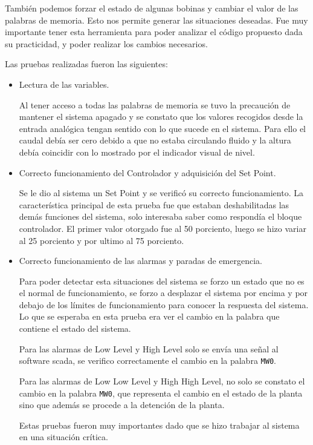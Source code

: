 También podemos forzar el estado de algunas bobinas y cambiar el valor de las 
palabras de memoria. Esto nos permite generar las situaciones deseadas.
Fue muy importante tener esta herramienta para poder analizar el código propuesto
dada su practicidad, y poder realizar los cambios necesarios.

Las pruebas realizadas fueron las siguientes:

\begin{itemize}
 \item Lectura de las variables.
 
 Al tener acceso a todas las palabras de memoria se tuvo la precaución de mantener el
 sistema apagado y se constato que los valores recogidos desde la entrada analógica
 tengan sentido con lo que sucede en el sistema. Para ello el caudal debía ser cero debido
 a que no estaba circulando fluido y la altura debía coincidir con lo mostrado por el 
 indicador visual de nivel. 
 
 \item Correcto funcionamiento del Controlador y adquisición del Set Point.
 
 Se le dio al sistema un Set Point y se verificó su correcto funcionamiento. 
 La característica principal de esta prueba fue que estaban deshabilitadas las demás
 funciones del sistema, solo interesaba saber como respondía el bloque controlador.
 El primer valor otorgado fue al 50 porciento, luego se hizo variar al 25 porciento
 y por ultimo al 75 porciento.
 
 \item Correcto funcionamiento de las alarmas y paradas de emergencia.
 
 Para poder detectar esta situaciones del sistema se forzo un estado que no es el normal
 de funcionamiento, se forzo a desplazar el sistema por encima y por debajo de los
 límites de funcionamiento para conocer la respuesta del sistema. Lo que se esperaba en esta
 prueba era ver el cambio en la palabra que contiene el estado del sistema.
 
 Para las alarmas de Low Level y High Level solo se envía una señal al software \gls{scada},
 se verifico correctamente el cambio en la palabra \verb|MW0|.
 
 Para las alarmas de Low Low Level y High High Level, no solo se constato el cambio en la
 palabra \verb|MW0|, que representa el cambio en el estado de la planta sino que además 
 se procede a la detención de la planta.
 
 Estas pruebas fueron muy importantes dado que se hizo trabajar al sistema en una situación
 crítica.
 

\end{itemize}

